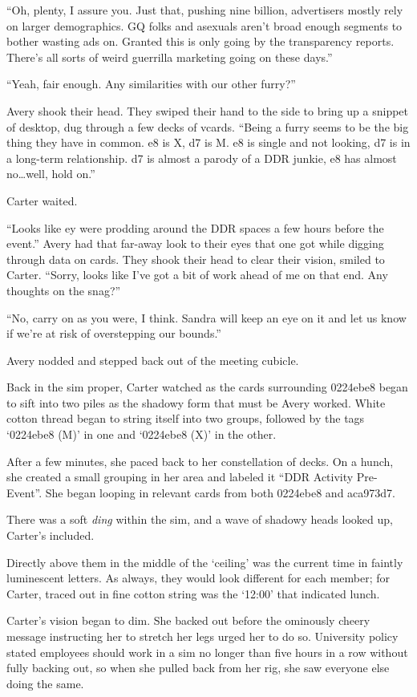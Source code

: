 ``Oh, plenty, I assure you. Just that, pushing nine billion, advertisers mostly rely on larger demographics. GQ folks and asexuals aren't broad enough segments to bother wasting ads on. Granted this is only going by the transparency reports. There's all sorts of weird guerrilla marketing going on these days.''

``Yeah, fair enough. Any similarities with our other furry?''

Avery shook their head. They swiped their hand to the side to bring up a snippet of desktop, dug through a few decks of vcards. ``Being a furry seems to be the big thing they have in common. e8 is X, d7 is M. e8 is single and not looking, d7 is in a long-term relationship. d7 is almost a parody of a DDR junkie, e8 has almost no\ldots{}well, hold on.''

Carter waited.

``Looks like ey were prodding around the DDR spaces a few hours before the event.'' Avery had that far-away look to their eyes that one got while digging through data on cards. They shook their head to clear their vision, smiled to Carter. ``Sorry, looks like I've got a bit of work ahead of me on that end. Any thoughts on the snag?''

``No, carry on as you were, I think. Sandra will keep an eye on it and let us know if we're at risk of overstepping our bounds.''

Avery nodded and stepped back out of the meeting cubicle.

Back in the sim proper, Carter watched as the cards surrounding 0224ebe8 began to sift into two piles as the shadowy form that must be Avery worked. White cotton thread began to string itself into two groups, followed by the tags `0224ebe8 (M)' in one and `0224ebe8 (X)' in the other.

After a few minutes, she paced back to her constellation of decks. On a hunch, she created a small grouping in her area and labeled it ``DDR Activity Pre-Event''. She began looping in relevant cards from both 0224ebe8 and aca973d7.

There was a soft \emph{ding} within the sim, and a wave of shadowy heads looked up, Carter's included.

Directly above them in the middle of the `ceiling' was the current time in faintly luminescent letters. As always, they would look different for each member; for Carter, traced out in fine cotton string was the `12:00' that indicated lunch.

Carter's vision began to dim. She backed out before the ominously cheery message instructing her to stretch her legs urged her to do so. University policy stated employees should work in a sim no longer than five hours in a row without fully backing out, so when she pulled back from her rig, she saw everyone else doing the same.

